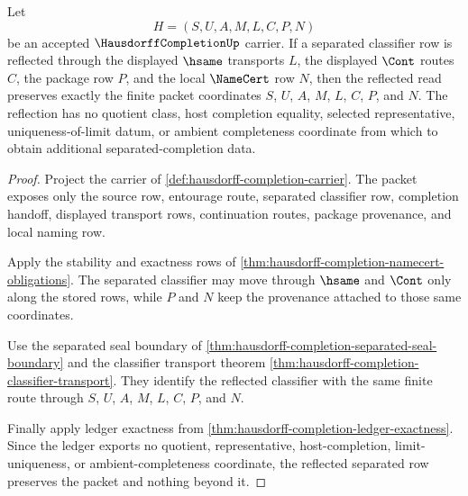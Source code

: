 \begin{theorem}
\label{thm:hausdorff-completion-separated-reflection}
Let
$$
H=(S,U,A,M,L,C,P,N)
$$
be an accepted $\HausdorffCompletionUp$ carrier. If a separated classifier row is reflected through the displayed $\hsame$ transports $L$, the displayed $\Cont$ routes $C$, the package row $P$, and the local $\NameCert$ row $N$, then the reflected read preserves exactly the finite packet coordinates $S$, $U$, $A$, $M$, $L$, $C$, $P$, and $N$. The reflection has no quotient class, host completion equality, selected representative, uniqueness-of-limit datum, or ambient completeness coordinate from which to obtain additional separated-completion data.
\end{theorem}
\begin{proof}
Project the carrier of \autoref{def:hausdorff-completion-carrier}. The packet exposes only the source row, entourage route, separated classifier row, completion handoff, displayed transport rows, continuation routes, package provenance, and local naming row.

Apply the stability and exactness rows of \autoref{thm:hausdorff-completion-namecert-obligations}. The separated classifier may move through $\hsame$ and $\Cont$ only along the stored rows, while $P$ and $N$ keep the provenance attached to those same coordinates.

Use the separated seal boundary of \autoref{thm:hausdorff-completion-separated-seal-boundary} and the classifier transport theorem \autoref{thm:hausdorff-completion-classifier-transport}. They identify the reflected classifier with the same finite route through $S$, $U$, $A$, $M$, $L$, $C$, $P$, and $N$.

Finally apply ledger exactness from \autoref{thm:hausdorff-completion-ledger-exactness}. Since the ledger exports no quotient, representative, host-completion, limit-uniqueness, or ambient-completeness coordinate, the reflected separated row preserves the packet and nothing beyond it.
\end{proof}

